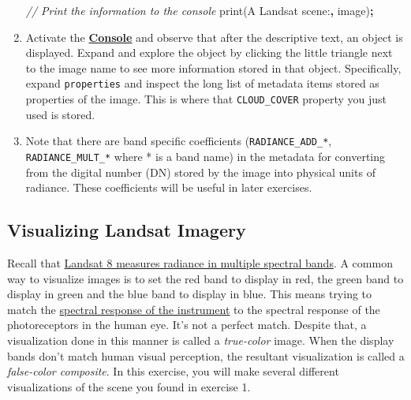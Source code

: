 \documentclass[
]{article}
\newenvironment{Shaded}{\begin{snugshade}}{\end{snugshade}}
\newcommand{\CommentTok}[1]{\textcolor[rgb]{0.56,0.35,0.01}{\textit{#1}}}
\newcommand{\FunctionTok}[1]{\textcolor[rgb]{0.00,0.00,0.00}{#1}}
\newcommand{\NormalTok}[1]{#1}
\newcommand{\OperatorTok}[1]{\textcolor[rgb]{0.81,0.36,0.00}{\textbf{#1}}}
\newcommand{\StringTok}[1]{\textcolor[rgb]{0.31,0.60,0.02}{#1}}
\begin{document}
\begin{enumerate}
\begin{Shaded}
\begin{Highlighting}[]
  \CommentTok{//  Print the information to the console }
  \FunctionTok{print}\NormalTok{(}\StringTok{\textquotesingle{}A Landsat scene:\textquotesingle{}}\OperatorTok{,}\NormalTok{ image)}\OperatorTok{;}  
\end{Highlighting}
\end{Shaded}
\item
  Activate the \href{https://developers.google.com/earth-engine/playground\#console-tab}{\textbf{Console}} and observe that after the descriptive text, an object is displayed. Expand and explore the object by clicking the little triangle next to the image name to see more information stored in that object. Specifically, expand \texttt{properties} and inspect the long list of metadata items stored as properties of the image. This is where that \texttt{CLOUD\_COVER} property you just used is stored.
\item
  Note that there are band specific coefficients (\texttt{RADIANCE\_ADD\_*}, \texttt{RADIANCE\_MULT\_*} where * is a band name) in the metadata for converting from the digital number (DN) stored by the image into physical units of radiance. These coefficients will be useful in later exercises.
\end{enumerate}

\hypertarget{visualizing-landsat-imagery}{%
\subsection{Visualizing Landsat Imagery}\label{visualizing-landsat-imagery}}

Recall that \href{https://svs.gsfc.nasa.gov/cgi-bin/details.cgi?aid=11491}{Landsat 8 measures radiance in multiple spectral bands}. A common way to visualize images is to set the red band to display in red, the green band to display in green and the blue band to display in blue. This means trying to match the \href{http://landsat.gsfc.nasa.gov/?p=5779}{spectral response of the instrument} to the spectral response of the photoreceptors in the human eye. It's not a perfect match. Despite that, a visualization done in this manner is called a \emph{true-color} image. When the display bands don't match human visual perception, the resultant visualization is called a \emph{false-color composite}. In this exercise, you will make several different visualizations of the scene you found in exercise 1.
\end{document}
